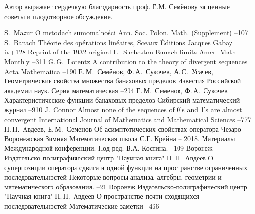 \documentclass{article}
\theoremstyle{plain}
\theoremstyle{definition}
\begin{document}
\begin{fulltext}
Автор выражает сердечную благодарность проф. Е.М. Семёнову за ценные cоветы и плодотворное обсуждение.
\end{fulltext}



\begin{thebibliography}{99}
	\by S.~Mazur
	\paper O metodach sumomalności
	\jour Ann. Soc. Polon. Math. (Supplement)
	--107
	\by S.~Banach
	\book Théorie des opérations linéaires,
	\publaddr Sceaux
	\publ Éditions Jacques Gabay
	\pages iv+128
	\miscnote Reprint of the 1932 original
	\by L.~Sucheston
	\paper Banach limits
	\jour Amer. Math. Monthly
	--311
	\by G.\,G.~Lorentz
	\paper A contribution to the theory of divergent sequences
	\jour Acta Mathematica
	--190
	\by Е.\,М.~Семёнов, Ф.\,А.~Сукочев, А.\,С.~Усачев,
	\paper Геометрические свойства множества банаховых пределов
	\jour Известия Российской академии наук. Серия математическая
	--204
	\by Е.\,М.~Семенов, Ф.\,А.~Сукочев
	\paper Характеристические функции банаховых пределов
	\jour Сибирский математический журнал
	--910
	\by J.~Connor
	\paper Almost none of the sequences of 0’s and 1’s are almost convergent
	\jour International Journal of Mathematics and Mathematical Sciences
	--777
	\by Н.\,Н.~Авдеев, Е.\,М.~Семенов
	\paper Об асимптотических свойствах оператора Чезаро
	\jour Воронежская Зимняя Математическая школа С.Г. Крейна -- 2018.
	Материалы Международной конференции. Под ред. В.А. Костина.
	--109
	\publaddr Воронеж
	\publ Издательско-полиграфический центр "Научная книга"
	\by Н.\,Н.~Авдеев
	\paper О суперпозиции оператора сдвига и одной функции на пространстве
	ограниченных последовательностей
	\jour Некоторые вопросы анализа, алгебры, геометрии и математического
	образования.
	--21
	\publaddr Воронеж
	\publ Издательско-полиграфический центр "Научная книга"
	\by Н.\,Н.~Авдеев
	\paper О пространстве почти сходящихся последовательностей
	\jour Математические заметки
	--466
\end{thebibliography}
\end{document}
